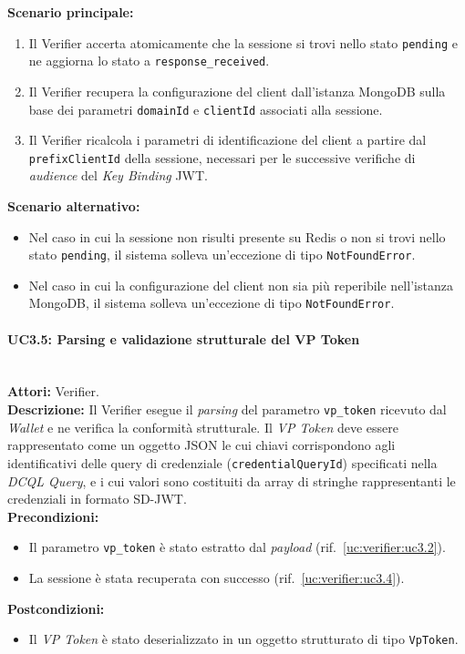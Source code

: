 \noindent\textbf{Scenario principale:}
\begin{enumerate}
    \item Il Verifier accerta atomicamente che la sessione si trovi nello stato \texttt{pending} e ne aggiorna lo stato a \texttt{response\_\allowbreak{}received}.
    \item Il Verifier recupera la configurazione del client dall'istanza MongoDB sulla base dei parametri \texttt{domainId} e \texttt{clientId} associati alla sessione.
    \item Il Verifier ricalcola i parametri di identificazione del client a partire dal \texttt{prefixClientId} della sessione, necessari per le successive verifiche di \textit{audience} del \textit{Key Binding} JWT.
\end{enumerate}

\noindent\textbf{Scenario alternativo:}
\begin{itemize}
    \item Nel caso in cui la sessione non risulti presente su Redis o non si trovi nello stato \texttt{pending}, il sistema solleva un'eccezione di tipo \texttt{NotFoundError}.
    \item Nel caso in cui la configurazione del client non sia più reperibile nell'istanza MongoDB, il sistema solleva un'eccezione di tipo \texttt{NotFoundError}.
\end{itemize}

\paragraph{\large\bfseries UC3.5: Parsing e validazione strutturale del VP Token}
\label{uc:verifier:uc3.5}
\mbox{}\\
\noindent\textbf{Attori:} Verifier.
\\
\noindent\textbf{Descrizione:} Il Verifier esegue il \textit{parsing} del parametro \texttt{vp\_\allowbreak{}token} ricevuto dal \textit{Wallet} e ne verifica la conformità strutturale. Il \textit{VP Token} deve essere rappresentato come un oggetto JSON le cui chiavi corrispondono agli identificativi delle query di credenziale (\texttt{credentialQueryId}) specificati nella \textit{DCQL Query}, e i cui valori sono costituiti da array di stringhe rappresentanti le credenziali in formato SD-JWT.
\\
\noindent\textbf{Precondizioni:}
\begin{itemize}
    \item Il parametro \texttt{vp\_\allowbreak{}token} è stato estratto dal \textit{payload} (rif.\ \ref{uc:verifier:uc3.2}).
    \item La sessione è stata recuperata con successo (rif.\ \ref{uc:verifier:uc3.4}).
\end{itemize}
\noindent\textbf{Postcondizioni:}
\begin{itemize}
    \item Il \textit{VP Token} è stato deserializzato in un oggetto strutturato di tipo \texttt{VpToken}.
\end{itemize}

